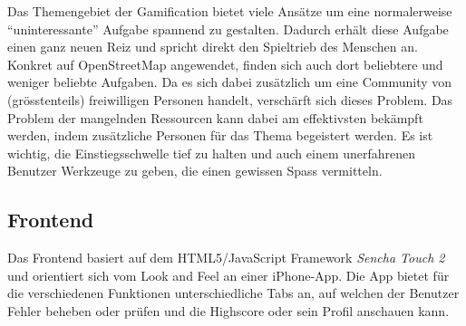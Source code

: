 Das Themengebiet der \gls{Gamification} bietet viele Ansätze um eine normalerweise "`uninteressante"' Aufgabe spannend zu gestalten.
Dadurch erhält diese Aufgabe einen ganz neuen Reiz und spricht direkt den Spieltrieb des Menschen an.
Konkret auf \gls{OpenStreetMap} angewendet, finden sich auch dort beliebtere und weniger beliebte Aufgaben.
Da es sich dabei zusätzlich um eine Community von (grösstenteils) freiwilligen Personen handelt, verschärft sich dieses Problem.
Das Problem der mangelnden Ressourcen kann dabei am effektivsten bekämpft werden, indem zusätzliche Personen für das Thema begeistert werden.
Es ist wichtig, die Einstiegsschwelle tief zu halten und auch einem unerfahrenen Benutzer Werkzeuge zu geben, die einen gewissen Spass vermitteln.

\subsection*{Frontend}
Das Frontend basiert auf dem HTML5/JavaScript Framework \emph{Sencha Touch 2} und orientiert sich vom Look and Feel an einer iPhone-App.
Die App bietet für die verschiedenen Funktionen unterschiedliche Tabs an, auf welchen der Benutzer Fehler beheben oder prüfen und die Highscore oder sein Profil anschauen kann.

